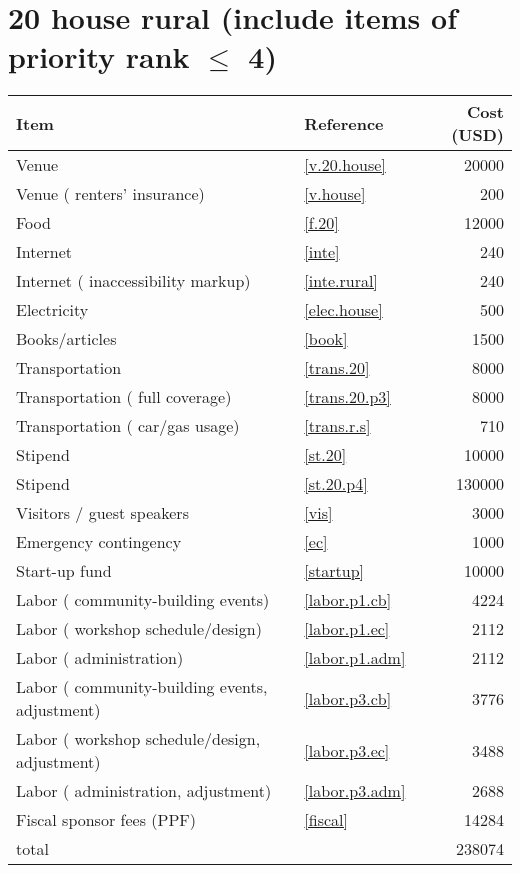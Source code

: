 \section*{20 house rural (include items of priority rank $\leq$ 4)}
\begin{center}
\begin{tabular}{llr}
Item & Reference & Cost (USD) \\ \hline
Venue & \ref{v.20.house} & 20000 \\
Venue ( renters' insurance) & \ref{v.house} & 200 \\
Food & \ref{f.20} & 12000 \\
Internet & \ref{inte} & 240 \\
Internet ( inaccessibility markup) & \ref{inte.rural} & 240 \\
Electricity & \ref{elec.house} & 500 \\
Books/articles & \ref{book} & 1500 \\
Transportation & \ref{trans.20} & 8000 \\
Transportation ( full coverage) & \ref{trans.20.p3} & 8000 \\
Transportation ( car/gas usage) & \ref{trans.r.s} & 710 \\
Stipend & \ref{st.20} & 10000 \\
Stipend & \ref{st.20.p4} & 130000 \\
Visitors / guest speakers & \ref{vis} & 3000 \\
Emergency contingency & \ref{ec} & 1000 \\
Start-up fund & \ref{startup} & 10000 \\
Labor ( community-building events) & \ref{labor.p1.cb} & 4224 \\
Labor ( workshop schedule/design) & \ref{labor.p1.ec} & 2112 \\
Labor ( administration) & \ref{labor.p1.adm} & 2112 \\
Labor ( community-building events, adjustment) & \ref{labor.p3.cb} & 3776 \\
Labor ( workshop schedule/design, adjustment) & \ref{labor.p3.ec} & 3488 \\
Labor ( administration, adjustment) & \ref{labor.p3.adm} & 2688 \\
Fiscal sponsor fees (PPF) & \ref{fiscal} & 14284 \\ \hline
total &  & 238074
\end{tabular}
\end{center}
\newpage
